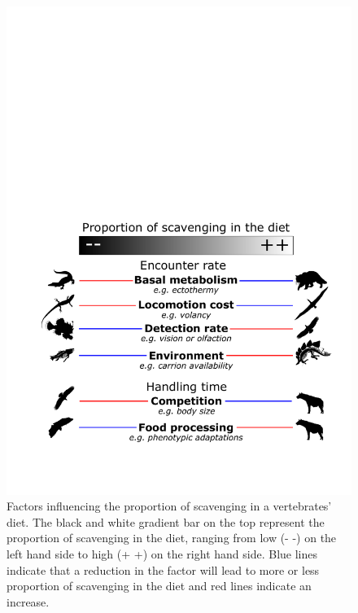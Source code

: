 \documentclass[a4paper,12pt]{article}
\begin{document}
\begin{figure}[!htbp]
\centering
   \includegraphics[width=1\textwidth]{Summary_figure/Summary_figure.pdf}
\caption{Factors influencing the proportion of scavenging in a vertebrates' diet. The black and white gradient bar on the top represent the proportion of scavenging in the diet, ranging from low (- -) on the left hand side to high (+ +) on the right hand side. Blue lines indicate that a reduction in the factor will lead to more or less proportion of scavenging in the diet and red lines indicate an increase.}
\label{Summary_figure}
\end{figure}
\end{document}
